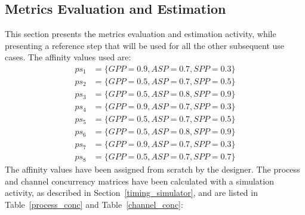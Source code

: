 \subsection{Metrics Evaluation and Estimation}
%
This section presents the metrics evaluation and estimation activity, while presenting a reference step that will be used for all the other subsequent use cases. The affinity values used are:
%
\footnotesize
\begin{align*}
    ps_1 &= \{ GPP=0.9, ASP=0.7, SPP=0.3 \} \\
    ps_2 &= \{ GPP=0.5, ASP=0.7, SPP=0.5 \} \\
    ps_3 &= \{ GPP=0.5, ASP=0.8, SPP=0.9 \} \\
    ps_4 &= \{ GPP=0.9, ASP=0.7, SPP=0.3 \}  \\
    ps_5 &= \{ GPP=0.5, ASP=0.7, SPP=0.5 \} \\
    ps_6 &= \{ GPP=0.5, ASP=0.8, SPP=0.9 \} \\
    ps_7 &= \{ GPP=0.9, ASP=0.7, SPP=0.3 \} \\
    ps_8 &= \{ GPP=0.5, ASP=0.7, SPP=0.7 \} 
\end{align*}
\normalsize
%
The affinity values have been assigned from scratch by the designer. The process and channel concurrency matrices have been calculated with a simulation activity, as described in Section~\ref{timing_simulator}, and are listed in Table~\ref{process_conc} and Table~\ref{channel_conc}: \par
%
\begin{table}[htbp]
\caption{Processes concurrency.}
\begin{center}
\label{process_conc}
\end{center}
\end{table}

